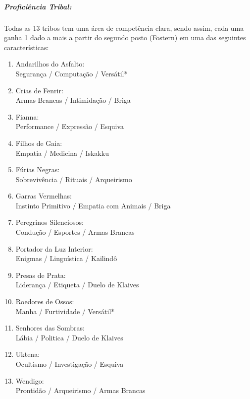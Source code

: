 \subparagraph{\bf Proficiência Tribal:}

Todas as 13 tribos tem uma área de competência clara, sendo assim, cada uma ganha 1 dado a mais a partir do segundo posto (Fostern) em uma das seguintes características:

\begin{enumerate}[noitemsep]
    \item Andarilhos do Asfalto: \\Segurança / Computação / Versátil*
    
    \item Crias de Fenrir: \\Armas Brancas / Intimidação / Briga
    
    \item Fianna: \\Performance / Expressão / Esquiva
    
    \item Filhos de Gaia: \\Empatia / Medicina / Iskakku
    
    \item Fúrias Negras: \\Sobrevivência / Rituais / Arqueirismo
    
    \item Garras Vermelhas: \\Instinto Primitivo / Empatia com Animais / Briga
    
    \item Peregrinos Silenciosos: \\Condução / Esportes / Armas Brancas
    
    \item Portador da Luz Interior: \\Enigmas / Linguística / Kailindô
    
    \item Presas de Prata: \\Liderança / Etiqueta / Duelo de Klaives
    
    \item Roedores de Ossos: \\Manha / Furtividade / Versátil*
    
    \item Senhores das Sombras: \\Lábia / Politica / Duelo de Klaives
    
    \item Uktena: \\Ocultismo / Investigação / Esquiva
    
    \item Wendigo: \\Prontidão / Arqueirismo / Armas Brancas

\end{enumerate}

